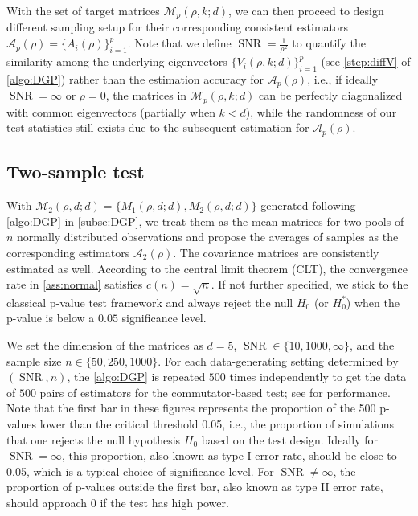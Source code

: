 \documentclass[12pt]{article}
\numberwithin{thm}{section}
\numberwithin{defn}{section}
\numberwithin{lem}{section}
\numberwithin{prop}{section}
\numberwithin{cor}{section}
\numberwithin{rem}{section}
\DeclareMathOperator{\SNR}{SNR}
\begin{document}
With the set of target matrices $\mathcal{M}_p(\rho, k; d)$, we can then proceed to design different sampling setup for their corresponding consistent estimators $\mathcal{A}_p(\rho) = \{A_i(\rho)\}_{i=1}^p$. Note that we define $\SNR = \frac{1}{\rho^2}$ to quantify the similarity among the underlying eigenvectors $\{V_i(\rho, k; d)\}_{i=1}^p$ (see \autoref{step:diffV} of \autoref{algo:DGP}) rather than the estimation accuracy for $\mathcal{A}_p(\rho)$, i.e., if ideally $\SNR = \infty$ or $\rho = 0$, the matrices in $\mathcal{M}_p(\rho, k; d)$ can be perfectly diagonalized with common eigenvectors (partially when $k < d$), while the randomness of our test statistics still exists due to the subsequent estimation for $\mathcal{A}_p(\rho)$.

\vspace{-0.5cm}
\subsection{Two-sample test} \label{subse:2sample}
\vspace{-0.3cm}
With $\mathcal{M}_2(\rho, d; d) = \{M_1(\rho, d; d), M_2(\rho, d; d)\}$ generated following \autoref{algo:DGP} in \autoref{subse:DGP}, we treat them as the mean matrices for two pools of $n$ normally distributed observations and propose the averages of samples as the corresponding estimators $\mathcal{A}_2(\rho)$. The covariance matrices are consistently estimated as well. According to the central limit theorem (CLT), the convergence rate in \autoref{ass:normal} satisfies $c(n) = \sqrt{n}$. If not further specified, we stick to the classical p-value test framework and always reject the null $H_0$ (or $H_0^{*}$) when the p-value is below a $0.05$ significance level.


We set the dimension of the matrices as $d = 5$, $\SNR \in \{10, 1000, \infty\}$, and the sample size $n \in \{50, 250, 1000\}$. For each data-generating setting determined by $(\SNR, n)$, the \autoref{algo:DGP} is repeated $500$ times independently to get the data of $500$ pairs of estimators for the commutator-based test; see  for performance. Note that the first bar in these figures represents the proportion of the 500 p-values lower than the critical threshold 0.05, i.e., the proportion of simulations that one rejects the null hypothesis $H_0$ based on the test design. Ideally for $\SNR = \infty$, this proportion, also known as type I error rate, should be close to 0.05, which is a typical choice of significance level. For $\SNR \ne \infty$, the proportion of p-values outside the first bar, also known as type II error rate, should approach 0 if the test has high power.
\end{document}
